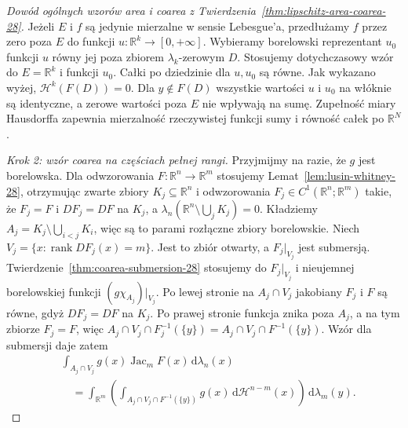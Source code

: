 \begin{proof}[Dowód ogólnych wzorów area i coarea z
Twierdzenia~\ref{thm:lipschitz-area-coarea-28}]
Jeżeli $E$ i $f$ są jedynie mierzalne w sensie
Lebesgue'a, przedłużamy $f$ przez zero poza $E$
do funkcji $u:\mathbb R^k\to[0,+\infty]$.
Wybieramy borelowski reprezentant $u_0$ funkcji $u$
równy jej poza zbiorem $\lambda_k$-zerowym $D$.
Stosujemy dotychczasowy wzór do $E=\mathbb R^k$
i funkcji $u_0$. Całki po dziedzinie dla $u,u_0$
są równe. Jak wykazano wyżej, $\mathcal H^k(F(D))=0$.
Dla $y\notin F(D)$ wszystkie wartości $u$ i $u_0$
na włóknie są identyczne, a zerowe wartości poza $E$
nie wpływają na sumę. Zupełność miary Hausdorffa
zapewnia mierzalność rzeczywistej funkcji sumy
i równość całek po $\mathbb R^N$.

\emph{Krok 2: wzór coarea na częściach pełnej rangi.}
Przyjmijmy na razie, że $g$ jest borelowska.
Dla odwzorowania $F:\mathbb R^n\to\mathbb R^m$
stosujemy Lemat~\ref{lem:lusin-whitney-28},
otrzymując zwarte zbiory $K_j\subseteq\mathbb R^n$
i odwzorowania $F_j\in C^1(\mathbb R^n;\mathbb R^m)$
takie, że $F_j=F$ i $DF_j=DF$ na $K_j$, a
$\lambda_n(\mathbb R^n\setminus\bigcup_jK_j)=0$.
Kładziemy $A_j=K_j\setminus\bigcup_{i<j}K_i$,
więc są to parami rozłączne zbiory borelowskie.
Niech
$V_j=\{x:\operatorname{rank}DF_j(x)=m\}$.
Jest to zbiór otwarty, a $F_j|_{V_j}$ jest
submersją. Twierdzenie~\ref{thm:coarea-submersion-28}
stosujemy do $F_j|_{V_j}$ i nieujemnej borelowskiej
funkcji $(g\chi_{A_j})|_{V_j}$. Po lewej stronie
na $A_j\cap V_j$ jakobiany $F_j$ i $F$ są równe,
gdyż $DF_j=DF$ na $K_j$. Po prawej stronie
funkcja znika poza $A_j$, a na tym zbiorze
$F_j=F$, więc
$A_j\cap V_j\cap F_j^{-1}(\{y\})
=A_j\cap V_j\cap F^{-1}(\{y\})$.
Wzór dla submersji daje zatem
\begin{align*}
 &\int_{A_j\cap V_j}g(x)\operatorname{Jac}_mF(x)
 \,\mathrm d\lambda_n(x)\\
 &\quad=\int_{\mathbb R^m}\left(
 \int_{A_j\cap V_j\cap F^{-1}(\{y\})}
 g(x)\,\mathrm d\mathcal H^{n-m}(x)\right)
 \,\mathrm d\lambda_m(y).
\end{align*}


\end{proof}
